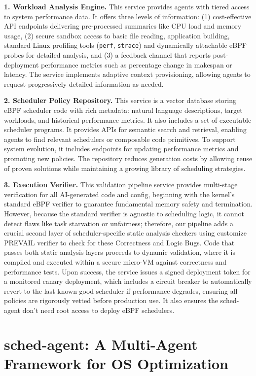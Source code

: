 \documentclass[preprint]{article}
\newcommand{\agent}{sched-agent\xspace}
\begin{document}
\textbf{1. Workload Analysis Engine.} This service provides agents with tiered access to system performance data. It offers three levels of information: (1) cost-effective API endpoints delivering pre-processed summaries like CPU load and memory usage, (2) secure sandbox access to basic file reading, application building, standard Linux profiling tools (\texttt{perf}, \texttt{strace}) and dynamically attachable eBPF probes for detailed analysis, and (3) a feedback channel that reports post-deployment performance metrics such as percentage change in makespan or latency. The service implements adaptive context provisioning, allowing agents to request progressively detailed information as needed.

\textbf{2. Scheduler Policy Repository.} This service is a vector database storing eBPF scheduler code with rich metadata: natural language descriptions, target workloads, and historical performance metrics. It also includes a set of executable scheduler programs. It provides APIs for semantic search and retrieval, enabling agents to find relevant schedulers or composable code primitives. To support system evolution, it includes endpoints for updating performance metrics and promoting new policies. The repository reduces generation costs by allowing reuse of proven solutions while maintaining a growing library of scheduling strategies.

\textbf{3. Execution Verifier.} This validation pipeline service provides multi-stage verification for all AI-generated code and config, beginning with the kernel's standard eBPF verifier to guarantee fundamental memory safety and termination. However, because the standard verifier is agnostic to scheduling logic, it cannot detect flaws like task starvation or unfairness; therefore, our pipeline adds a crucial second layer of scheduler-specific static analysis checkers using customize PREVAIL verifier\cite{prevail} to check for these Correctness and Logic Bugs. Code that passes both static analysis layers proceeds to dynamic validation, where it is compiled and executed within a secure micro-VM against correctness and performance tests. Upon success, the service issues a signed deployment token for a monitored canary deployment, which includes a circuit breaker to automatically revert to the last known-good scheduler if performance degrades, ensuring all policies are rigorously vetted before production use. It also ensures the \agent don't need root access to deploy eBPF schedulers.

\section{\agent: A Multi-Agent Framework for OS Optimization}
\label{sec:sched_agents}
\end{document}
